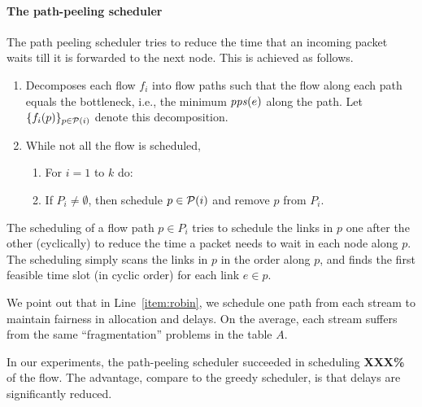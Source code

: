 \documentclass[12pt]{article}
\newenvironment{proof sketch}[1]{\noindent {\emph{Proof sketch of #1:}}}{\hfill \qed}
\newcommand{\pps}{\text{\emph{pps}}}
\begin{document}
\paragraph{The path-peeling scheduler}
The path peeling scheduler tries to reduce the time that an incoming
packet waits till it is forwarded to the next node. This is achieved
as follows.
\begin{enumerate}
\item Decomposes each flow $f_i$ into flow paths such that the flow
  along each path equals the bottleneck, i.e., the minimum $\pps(e)$ along the path.  Let
  $\{f_i(p)\}_{p\in {\cal{P}}(i)}$ denote this decomposition.
\item While not all the flow is scheduled,
  \begin{enumerate}
  \item \label{item:robin} For $i=1$ to $k$ do:
  \item If $P_i\neq \emptyset$, then schedule $p\in {\cal P}(i)$ and remove $p$ from $P_i$.
  \end{enumerate}
\end{enumerate}
The scheduling of a flow path $p\in P_i$ tries to schedule the links in
$p$ one after the other (cyclically) to reduce the time a packet needs to wait in each node
along $p$. The scheduling simply scans the links in $p$ in the order
along $p$, and finds the first feasible time slot (in cyclic order) for
each link $e\in p$.

We point out that in Line~\ref{item:robin}, we schedule one path from
each stream to maintain fairness in allocation and delays. On the average, each stream
suffers from the same ``fragmentation'' problems in the table $A$.

In our experiments, the path-peeling scheduler succeeded in scheduling
\textbf{XXX\%} of the flow. The advantage, compare to the greedy
scheduler, is that delays are significantly reduced.
\end{document}
